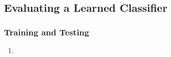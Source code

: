 \documentclass[conference]{styles/acmsiggraph}
\begin{document}
        
    \subsection{Evaluating a Learned Classifier}
    
        \subsubsection{Training and Testing}
            \begin{enumerate}
                \item 
            \end{enumerate}
            
            
            
    
    
    
    
        
    
                
                
    
    
        
            
            
    

    

    
\end{document}
